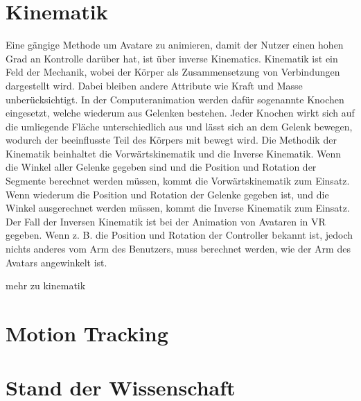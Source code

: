 \section{Kinematik}
Eine gängige Methode um Avatare zu animieren, damit der Nutzer einen hohen Grad an Kontrolle darüber hat, ist über inverse Kinematics. Kinematik ist ein Feld der Mechanik, wobei der Körper als Zusammensetzung von Verbindungen dargestellt wird. Dabei bleiben andere Attribute wie Kraft und Masse unberücksichtigt. In der Computeranimation werden dafür sogenannte Knochen eingesetzt, welche wiederum aus Gelenken bestehen. Jeder Knochen wirkt sich auf die umliegende Fläche unterschiedlich aus und lässt sich an dem Gelenk bewegen, wodurch der beeinflusste Teil des Körpers mit bewegt wird.
Die Methodik der Kinematik beinhaltet die Vorwärtskinematik und die Inverse Kinematik. Wenn die Winkel aller Gelenke gegeben sind und die Position und Rotation der Segmente berechnet werden müssen, kommt die Vorwärtskinematik zum Einsatz. Wenn wiederum die Position und Rotation der Gelenke gegeben ist, und die Winkel ausgerechnet werden müssen, kommt die Inverse Kinematik zum Einsatz. Der Fall der Inversen Kinematik ist bei der Animation von Avataren in VR gegeben. Wenn z. B. die Position und Rotation der Controller bekannt ist, jedoch nichts anderes vom Arm des Benutzers, muss berechnet werden, wie der Arm des Avatars angewinkelt ist.\cite{Xia2009}


mehr zu kinematik

\section{Motion Tracking}


\section{Stand der Wissenschaft}


